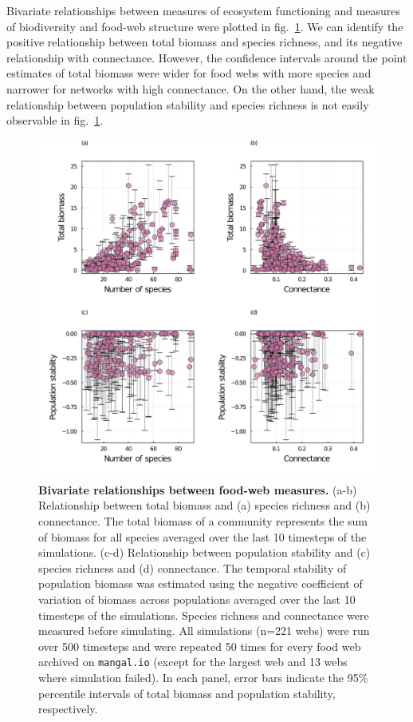 \documentclass[11pt]{article}
\makeatletter
\def\maxwidth{\ifdim\Gin@nat@width>\linewidth\linewidth
\else\Gin@nat@width\fi}
\let\Oldincludegraphics\includegraphics
\renewcommand{\includegraphics}[1]{\Oldincludegraphics[width=\maxwidth]{#1}}
\makeatother
\begin{document}
Bivariate relationships between measures of ecosystem functioning and
measures of biodiversity and food-web structure were plotted in
fig.~\ref{fig:bivariate}. We can identify the positive relationship
between total biomass and species richness, and its negative
relationship with connectance. However, the confidence intervals around
the point estimates of total biomass were wider for food webs with more
species and narrower for networks with high connectance. On the other
hand, the weak relationship between population stability and species
richness is not easily observable in fig.~\ref{fig:bivariate}.

\begin{figure}
\hypertarget{fig:bivariate}{%
\centering
\includegraphics{figures/bivariate_relationships.png}
\caption{\textbf{Bivariate relationships between food-web measures.}
(a-b) Relationship between total biomass and (a) species richness and
(b) connectance. The total biomass of a community represents the sum of
biomass for all species averaged over the last 10 timesteps of the
simulations. (c-d) Relationship between population stability and (c)
species richness and (d) connectance. The temporal stability of
population biomass was estimated using the negative coefficient of
variation of biomass across populations averaged over the last 10
timesteps of the simulations. Species richness and connectance were
measured before simulating. All simulations (n=221 webs) were run over
500 timesteps and were repeated 50 times for every food web archived on
\texttt{mangal.io} (except for the largest web and 13 webs where
simulation failed). In each panel, error bars indicate the 95\%
percentile intervals of total biomass and population stability,
respectively.}\label{fig:bivariate}
}
\end{figure}
\end{document}
